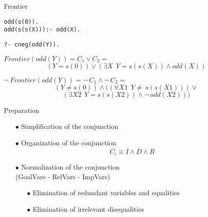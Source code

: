 \documentclass[pdf,slideColor,contemporain]{prosper}
\begin{document}
\begin{slide}{Frontier}

\begin{small}
\begin{minipage}{2.5in}
{\blue 
\begin{verbatim}
odd(s(0)).
odd(s(s(X))):- odd(X).

\end{verbatim}}
\end{minipage} 
\begin{minipage}{1.5in}
{\blue 
\begin{verbatim}
?- cneg(odd(Y)).

\end{verbatim}}
\end{minipage}
\end{small}



$Frontier(odd(Y)) = C_1 \vee C_2 = $ 
\[ ( Y=s(0) ) \vee ( \exists X~~ Y=s(s(X)) \wedge odd(X) )  \] 

$\neg ~Frontier(odd(Y)) = \neg~ C_1 \wedge \neg~ C_2 = $
\[  ( Y \neq s(0) ) \wedge ( (\forall X1~~ Y \neq ~s(s(X1))) \vee\] 
\[ (\exists X2~~ Y=s(s(X2)) \wedge \neg~ odd(X2) ))  \] 

\end{slide}
\begin{slide}{Preparation}
     \begin{itemize}
        \item[$\bullet$] {\blue Simplification} of the conjunction
        \item[$\bullet$] {\blue Organization} of the conjunction
\[ C_i \equiv \overline{I} \wedge \overline{D} \wedge \overline{R} \]
        \item[$\bullet$] {\blue Normalization} of the conjunction \\
                      (GoalVars - RelVars - ImpVars)
              \begin{itemize}
                \item[$\bullet$] Elimination of {\blue redundant variables} and {\blue equalities}
                \item[$\bullet$] Elimination of {\blue irrelevant disequalities}
              \end{itemize}
     \end{itemize}
\end{slide}
\end{document}
